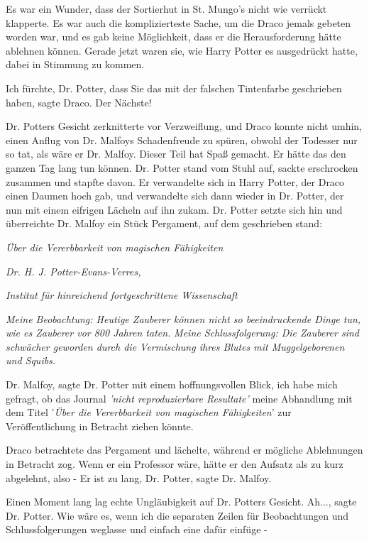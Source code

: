 Es war ein Wunder, dass der Sortierhut in St. Mungo's nicht wie verrückt
klapperte. Es war auch die komplizierteste Sache, um die Draco jemals gebeten
worden war, und es gab keine Möglichkeit, dass er die Herausforderung hätte
ablehnen können. Gerade jetzt waren sie, wie Harry Potter es ausgedrückt hatte,
dabei in Stimmung zu kommen.

\glqq Ich fürchte, Dr. Potter, dass Sie das mit der falschen Tintenfarbe
geschrieben haben\grqq{}, sagte Draco. \glqq Der Nächste!\grqq{}

Dr. Potters Gesicht zerknitterte vor Verzweiflung, und Draco konnte nicht umhin,
einen Anflug von Dr. Malfoys Schadenfreude zu spüren, obwohl der Todesser nur so
tat, als wäre er Dr. Malfoy. Dieser Teil hat Spaß gemacht. Er hätte das den
ganzen Tag lang tun können. Dr. Potter stand vom Stuhl auf, sackte erschrocken
zusammen und stapfte davon. Er verwandelte sich in Harry Potter, der Draco einen
Daumen hoch gab, und verwandelte sich dann wieder in Dr. Potter, der nun mit
einem eifrigen Lächeln auf ihn zukam. Dr. Potter setzte sich hin und überreichte
Dr. Malfoy ein Stück Pergament, auf dem geschrieben stand:

\emph{Über die Vererbbarkeit von magischen Fähigkeiten }

\emph{Dr. H. J. Potter-Evans-Verres, }

\emph{Institut für hinreichend fortgeschrittene Wissenschaft }

\emph{Meine Beobachtung: Heutige Zauberer können nicht so beeindruckende Dinge
tun, wie es Zauberer vor 800 Jahren taten. } \emph{Meine Schlussfolgerung: Die
Zauberer sind schwächer geworden durch die Vermischung ihres Blutes mit
Muggelgeborenen und Squibs.}

\glqq Dr. Malfoy\grqq{}, sagte Dr. Potter mit einem hoffnungsvollen Blick, \glqq
ich habe mich gefragt, ob das Journal \emph{'nicht reproduzierbare Resultate'}
meine Abhandlung mit dem Titel '\emph{Über die Vererbbarkeit von magischen
Fähigkeiten}' zur Veröffentlichung in Betracht ziehen könnte.\grqq{}

Draco betrachtete das Pergament und lächelte, während er mögliche Ablehnungen in
Betracht zog. Wenn er ein Professor wäre, hätte er den Aufsatz als zu kurz
abgelehnt, also - \glqq Er ist zu lang, Dr. Potter\grqq{}, sagte Dr. Malfoy.

Einen Moment lang lag echte Ungläubigkeit auf Dr. Potters Gesicht. \glqq
Ah...\grqq{}, sagte Dr. Potter. \glqq Wie wäre es, wenn ich die separaten Zeilen
für Beobachtungen und Schlussfolgerungen weglasse und einfach eine dafür einfüge
-\grqq{}

